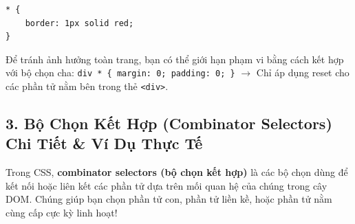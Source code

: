 \documentclass[11pt,oneside]{book}
\newcommand{\thd}[1]{\textcolor{white}{\textbf{\strut #1}}}
\newcommand{\codeinline}[1]{\textcolor{accentOrange}{\texttt{#1}}}
\begin{document}
\begin{codeWindow}
\begin{lstlisting}[language=CSS3]
* {
    border: 1px solid red;
}
\end{lstlisting}
\end{codeWindow}

\begin{noteBox}
Để tránh ảnh hưởng toàn trang, bạn có thể giới hạn phạm vi bằng cách kết hợp với bộ chọn cha:
\codeinline{div * \{ margin: 0; padding: 0; \}} $\rightarrow$ Chỉ áp dụng reset cho các phần tử nằm bên trong thẻ \codeinline{<div>}.
\end{noteBox}

\begin{prettyTableBox}
\sffamily\small
{}
\end{prettyTableBox}

\subsection{3. Bộ Chọn Kết Hợp (Combinator Selectors) Chi Tiết \& Ví Dụ Thực Tế}

\begin{conceptBox}
Trong CSS, \textbf{combinator selectors (bộ chọn kết hợp)} là các bộ chọn dùng để kết nối hoặc liên kết các phần tử dựa trên mối quan hệ của chúng trong cây DOM. Chúng giúp bạn chọn phần tử con, phần tử liền kề, hoặc phần tử nằm cùng cấp cực kỳ linh hoạt!
\end{conceptBox}
\end{document}
